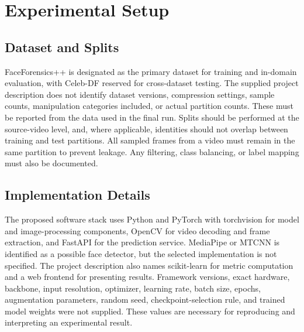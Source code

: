 \section{Experimental Setup}

\subsection{Dataset and Splits}
FaceForensics++ is designated as the primary dataset for training and in-domain evaluation, with Celeb-DF reserved for cross-dataset testing. The supplied project description does not identify dataset versions, compression settings, sample counts, manipulation categories included, or actual partition counts. These must be reported from the data used in the final run. Splits should be performed at the source-video level, and, where applicable, identities should not overlap between training and test partitions. All sampled frames from a video must remain in the same partition to prevent leakage. Any filtering, class balancing, or label mapping must also be documented.

\subsection{Implementation Details}
The proposed software stack uses Python and PyTorch with torchvision for model and image-processing components, OpenCV for video decoding and frame extraction, and FastAPI for the prediction service. MediaPipe or MTCNN is identified as a possible face detector, but the selected implementation is not specified. The project description also names scikit-learn for metric computation and a web frontend for presenting results. Framework versions, exact hardware, backbone, input resolution, optimizer, learning rate, batch size, epochs, augmentation parameters, random seed, checkpoint-selection rule, and trained model weights were not supplied. These values are necessary for reproducing and interpreting an experimental result.

